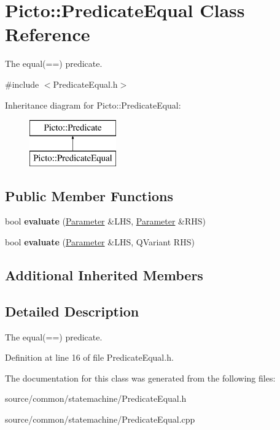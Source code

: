 \hypertarget{class_picto_1_1_predicate_equal}{\section{Picto\-:\-:Predicate\-Equal Class Reference}
\label{class_picto_1_1_predicate_equal}
}


The equal(==) predicate.  




{\ttfamily \#include $<$Predicate\-Equal.\-h$>$}

Inheritance diagram for Picto\-:\-:Predicate\-Equal\-:\begin{figure}[H]
\begin{center}
\leavevmode
\includegraphics[height=2.000000cm]{class_picto_1_1_predicate_equal}
\end{center}
\end{figure}
\subsection*{Public Member Functions}
\begin{DoxyCompactItemize}
\item 
\hypertarget{class_picto_1_1_predicate_equal_a51e49d7b720e6fb846c81f0d551f506c}{bool {\bfseries evaluate} (\hyperlink{class_picto_1_1_parameter}{Parameter} \&L\-H\-S, \hyperlink{class_picto_1_1_parameter}{Parameter} \&R\-H\-S)}\label{class_picto_1_1_predicate_equal_a51e49d7b720e6fb846c81f0d551f506c}

\item 
\hypertarget{class_picto_1_1_predicate_equal_ac09c07d069a047c7588aeb3103a4800c}{bool {\bfseries evaluate} (\hyperlink{class_picto_1_1_parameter}{Parameter} \&L\-H\-S, Q\-Variant R\-H\-S)}\label{class_picto_1_1_predicate_equal_ac09c07d069a047c7588aeb3103a4800c}

\end{DoxyCompactItemize}
\subsection*{Additional Inherited Members}


\subsection{Detailed Description}
The equal(==) predicate. 

Definition at line 16 of file Predicate\-Equal.\-h.



The documentation for this class was generated from the following files\-:\begin{DoxyCompactItemize}
\item 
source/common/statemachine/Predicate\-Equal.\-h\item 
source/common/statemachine/Predicate\-Equal.\-cpp\end{DoxyCompactItemize}
